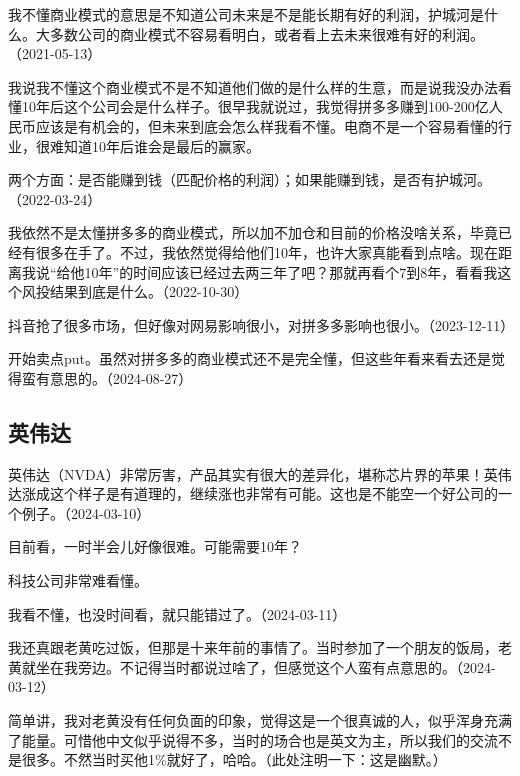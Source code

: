 我不懂商业模式的意思是不知道公司未来是不是能长期有好的利润，护城河是什么。大多数公司的商业模式不容易看明白，或者看上去未来很难有好的利润。（2021-05-13）

我说我不懂这个商业模式不是不知道他们做的是什么样的生意，而是说我没办法看懂10年后这个公司会是什么样子。很早我就说过，我觉得拼多多赚到100-200亿人民币应该是有机会的，但未来到底会怎么样我看不懂。电商不是一个容易看懂的行业，很难知道10年后谁会是最后的赢家。


两个方面：是否能赚到钱（匹配价格的利润）；如果能赚到钱，是否有护城河。（2022-03-24）

我依然不是太懂拼多多的商业模式，所以加不加仓和目前的价格没啥关系，毕竟已经有很多在手了。不过，我依然觉得给他们10年，也许大家真能看到点啥。现在距离我说“给他10年”的时间应该已经过去两三年了吧？那就再看个7到8年，看看我这个风投结果到底是什么。（2022-10-30）

抖音抢了很多市场，但好像对网易影响很小，对拼多多影响也很小。（2023-12-11）

开始卖点put。虽然对拼多多的商业模式还不是完全懂，但这些年看来看去还是觉得蛮有意思的。（2024-08-27）

\subsection{英伟达}


英伟达（NVDA）非常厉害，产品其实有很大的差异化，堪称芯片界的苹果！英伟达涨成这个样子是有道理的，继续涨也非常有可能。这也是不能空一个好公司的一个例子。（2024-03-10）


目前看，一时半会儿好像很难。可能需要10年？

科技公司非常难看懂。

我看不懂，也没时间看，就只能错过了。（2024-03-11）

我还真跟老黄吃过饭，但那是十来年前的事情了。当时参加了一个朋友的饭局，老黄就坐在我旁边。不记得当时都说过啥了，但感觉这个人蛮有点意思的。（2024-03-12）

简单讲，我对老黄没有任何负面的印象，觉得这是一个很真诚的人，似乎浑身充满了能量。可惜他中文似乎说得不多，当时的场合也是英文为主，所以我们的交流不是很多。不然当时买他1\%就好了，哈哈。（此处注明一下：这是幽默。）

